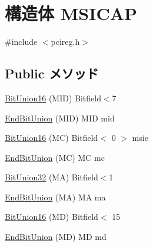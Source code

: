 \hypertarget{structMSICAP}{
\section{構造体 MSICAP}
\label{structMSICAP}
}


{\ttfamily \#include $<$pcireg.h$>$}\subsection*{Public メソッド}
\begin{DoxyCompactItemize}
\item 
\hyperlink{structMSICAP_a8ae40025c6651138a92ea9fc93a12098}{BitUnion16} (MID) Bitfield$<$7
\item 
\hyperlink{structMSICAP_a44011db573bff404882f760d4e731d74}{EndBitUnion} (MID) MID mid
\item 
\hyperlink{structMSICAP_af25036bb878bf499fb9264aba6657b1f}{BitUnion16} (MC) Bitfield$<$ 0 $>$ msie
\item 
\hyperlink{structMSICAP_a79c328ae88aa4235b35ac20e9734dc21}{EndBitUnion} (MC) MC mc
\item 
\hyperlink{structMSICAP_a9daab6579a0f1f5702c28ecdc2fb2a71}{BitUnion32} (MA) Bitfield$<$1
\item 
\hyperlink{structMSICAP_a25f5bc6b500281b215e5574e70ecdc50}{EndBitUnion} (MA) MA ma
\item 
\hyperlink{structMSICAP_a9f11fabc3c451789275787b397580f5d}{BitUnion16} (MD) Bitfield$<$ 15
\item 
\hyperlink{structMSICAP_a9942c151d36f1085f5cac0fd826265f9}{EndBitUnion} (MD) MD md
\end{DoxyCompactItemize}
